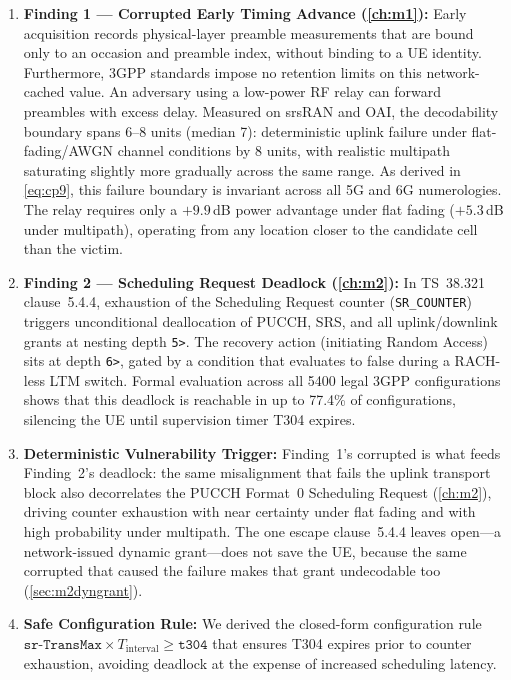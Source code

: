 \begin{enumerate}\itemsep3pt
  \item \textbf{Finding 1 --- Corrupted Early Timing Advance (\cref{ch:m1}):} Early \TA{} acquisition
        records physical-layer preamble measurements that are bound only to an occasion and preamble
        index, without binding to a UE identity. Furthermore, 3GPP standards impose no retention limits
        on this network-cached value. An adversary using a low-power RF relay can forward preambles with
        excess delay. Measured on srsRAN and OAI, the decodability boundary spans 6--8 units (median 7):
        deterministic uplink failure under flat-fading/AWGN channel conditions by 8 units, with realistic
        multipath saturating slightly more gradually across the same range. As derived in
        \cref{eq:cp9}, this failure boundary is invariant across all 5G and 6G numerologies. The relay
        requires only a $+9.9$\,dB power advantage under flat fading
        ($+5.3$\,dB under multipath), operating from any location closer to the candidate cell than the
        victim.
  \item \textbf{Finding 2 --- Scheduling Request Deadlock (\cref{ch:m2}):} In TS~38.321 clause~5.4.4,
        exhaustion of the Scheduling Request counter (\texttt{SR\_COUNTER}) triggers unconditional
        deallocation of PUCCH, SRS, and all uplink/downlink grants at nesting depth \texttt{5>}. The recovery
        action (initiating Random Access) sits at depth \texttt{6>}, gated by a condition that evaluates
        to false during a RACH-less LTM switch. Formal evaluation across all 5400 legal 3GPP configurations
        shows that this deadlock is reachable in up to 77.4\% of configurations, silencing the UE until
        supervision timer T304 expires.
  \item \textbf{Deterministic Vulnerability Trigger:} Finding~1's corrupted \TA{} is what feeds Finding~2's
        deadlock: the same misalignment that fails the uplink transport block also decorrelates the PUCCH
        Format~0 Scheduling Request (\cref{ch:m2}), driving counter exhaustion with near certainty under
        flat fading and with high probability under multipath. The one escape clause~5.4.4 leaves
        open---a network-issued dynamic grant---does not save the UE, because the same corrupted \TA{}
        that caused the failure makes that grant undecodable too (\cref{sec:m2dyngrant}).
  \item \textbf{Safe Configuration Rule:} We derived the closed-form configuration rule
        $\texttt{sr-TransMax} \times T_{\text{interval}} \ge \texttt{t304}$ that ensures T304 expires
        prior to counter exhaustion, avoiding deadlock at the expense of increased scheduling latency.
\end{enumerate}

